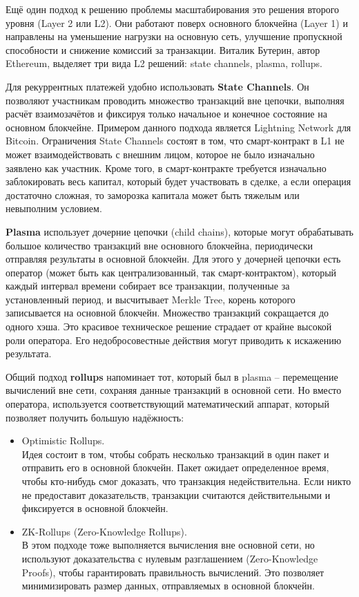 Ещё один подход к решению проблемы масштабирования это решения второго уровня (Layer 2 или L2). Они работают поверх основного блокчейна (Layer 1) и направлены на уменьшение нагрузки на основную сеть, улучшение пропускной способности и снижение комиссий за транзакции. Виталик Бутерин, автор Ethereum, выделяет три вида L2 решений: state channels, plasma, rollups\cite{label11}.

Для рекуррентных платежей удобно использовать \textbf{State Channels}. Он позволяют участникам проводить множество транзакций вне цепочки, выполняя расчёт взаимозачётов и фиксируя только начальное и конечное состояние на основном блокчейне. Примером данного подхода является Lightning Network для Bitcoin\cite{label14}. Ограничения State Channels состоят в том, что смарт-контракт в L1 не может взаимодействовать с внешним лицом, которое не было изначально заявлено как участник. Кроме того, в смарт-контракте требуется изначально заблокировать весь капитал, который будет участвовать в сделке, а если операция достаточно сложная, то заморозка капитала может быть тяжелым или невыполним условием.

\textbf{Plasma} использует дочерние цепочки (child chains), которые могут обрабатывать большое количество транзакций вне основного блокчейна, периодически отправляя результаты в основной блокчейн. Для этого у дочерней цепочки есть оператор (может быть как централизованный, так смарт-контрактом), который каждый интервал времени собирает все транзакции, полученные за установленный период, и высчитывает Merkle Tree, корень которого записывается на основной блокчейн. Множество транзакций сокращается до одного хэша. Это красивое техническое решение страдает от крайне высокой роли оператора. Его недобросовестные действия могут приводить к искажению результата.

Общий подход \textbf{rollups} напоминает тот, который был в plasma -- перемещение вычислений вне сети, сохраняя данные транзакций в основной сети. Но вместо оператора, используется соответствующий математический аппарат, который позволяет получить большую надёжность:
\begin{itemize}
	\item Optimistic Rollups.\\Идея состоит в том, чтобы собрать несколько транзакций в один пакет и отправить его в основной блокчейн. Пакет ожидает определенное время, чтобы кто-нибудь смог доказать, что транзакция недействительна. Если никто не предоставит доказательств, транзакции считаются действительными и фиксируется в основной блокчейн.

	\item ZK-Rollups (Zero-Knowledge Rollups).\\В этом подходе тоже выполняется вычисления вне основной сети, но используют доказательства с нулевым разглашением (Zero-Knowledge Proofs), чтобы гарантировать правильность вычислений. Это позволяет минимизировать размер данных, отправляемых в основной блокчейн.
\end{itemize}

